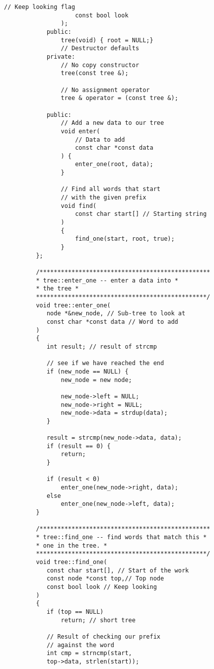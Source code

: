 \begin{LTR}
\begin{lstlisting}[style=C++Style]
         			// Keep looking flag
         			const bool look
         		);
         	public:
         		tree(void) { root = NULL;}
         		// Destructor defaults
        	private:
         		// No copy constructor
         		tree(const tree &);

         		// No assignment operator
         		tree & operator = (const tree &);

         	public:
         		// Add a new data to our tree
         		void enter(
         			// Data to add
         			const char *const data
         		) {
         			enter_one(root, data);
         		}

         		// Find all words that start
         		// with the given prefix
         		void find(
         			const char start[] // Starting string
         		)
         		{
         			find_one(start, root, true);
         		}
         };

         /************************************************
         * tree::enter_one -- enter a data into *
         * the tree *
         ************************************************/
         void tree::enter_one(
         	node *&new_node, // Sub-tree to look at
         	const char *const data // Word to add
         )
         {
         	int result; // result of strcmp

         	// see if we have reached the end
         	if (new_node == NULL) {
         		new_node = new node;

         		new_node->left = NULL;
         		new_node->right = NULL;
         		new_node->data = strdup(data);
         	}

         	result = strcmp(new_node->data, data);
         	if (result == 0) {
         		return;
         	}

         	if (result < 0)
         		enter_one(new_node->right, data);
         	else
         		enter_one(new_node->left, data);
         }

         /************************************************
         * tree::find_one -- find words that match this *
         * one in the tree. *
         ************************************************/
         void tree::find_one(
         	const char start[], // Start of the work
         	const node *const top,// Top node
         	const bool look // Keep looking
         )
         {
         	if (top == NULL)
         		return; // short tree

         	// Result of checking our prefix
         	// against the word
         	int cmp = strncmp(start,
         	top->data, strlen(start));


\end{lstlisting}
\end{LTR}
